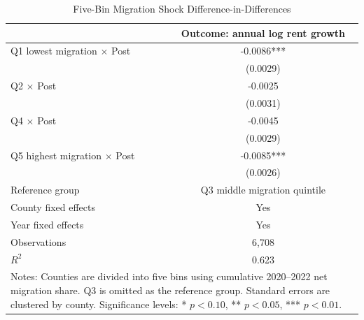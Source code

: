 \begin{table}[!htbp]\centering
\caption{Five-Bin Migration Shock Difference-in-Differences}\label{tab:quintile_did}
\begin{tabular}{lc}\toprule
 & Outcome: annual log rent growth \\
\midrule
Q1 lowest migration $\times$ Post & -0.0086*** \\
 & (0.0029) \\
Q2 $\times$ Post & -0.0025 \\
 & (0.0031) \\
Q4 $\times$ Post & -0.0045 \\
 & (0.0029) \\
Q5 highest migration $\times$ Post & -0.0085*** \\
 & (0.0026) \\
\midrule
Reference group & Q3 middle migration quintile \\
County fixed effects & Yes \\
Year fixed effects & Yes \\
Observations & 6,708 \\
$R^2$ & 0.623 \\
\bottomrule
\multicolumn{2}{p{0.72\textwidth}}{\footnotesize Notes: Counties are divided into five bins using cumulative 2020--2022 net migration share. Q3 is omitted as the reference group. Standard errors are clustered by county. Significance levels: * $p<0.10$, ** $p<0.05$, *** $p<0.01$.}
\end{tabular}
\end{table}

